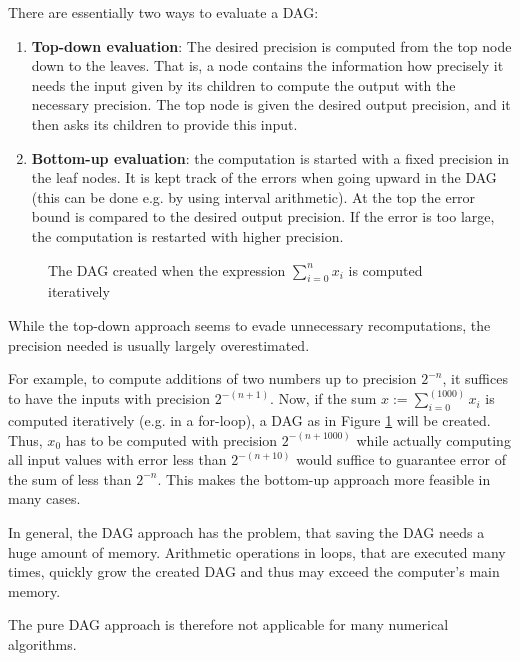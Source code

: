 		There are essentially two ways to evaluate a DAG:
		\begin{enumerate}
			\item \textbf{Top-down evaluation}: The desired precision is computed from the top node down to the leaves.
			That is, a node contains the information how precisely it needs the
      input given by its children to compute the output with the necessary precision.
      The top node is given the desired output precision, and it then asks its
      children to provide this input.
			\item \textbf{Bottom-up evaluation}:  the computation is started with a fixed precision in the leaf nodes. 
			It is kept track of the errors when going upward in the DAG (this can
      be done e.g. by using interval arithmetic). 
			At the top the error bound is compared to the desired output precision. 
      If the error is too large, the computation is restarted with higher
      precision.
		\end{enumerate}
    \begin{figure}[h]
      \centering
\caption{The DAG created when the expression $\sum_{i=0}^n x_i$ is computed
iteratively}\label{fig:sum dag}
\end{figure}
		While the top-down approach seems to evade unnecessary recomputations, the
    precision needed is usually largely overestimated.

    For example, to compute additions of two numbers up to precision $2^{-n}$,
    it suffices to have the inputs with precision $2^{-(n+1)}$.
    Now, if the sum $x := \sum_{i=0}^(1000) x_i$ is computed iteratively (e.g. in a
    for-loop), a DAG as in Figure \ref{fig:sum dag} will be created. 
    Thus, $x_0$ has to be computed with precision $2^{-(n+1000)}$ while actually
    computing all input values with error less than $2^{-(n+10)}$ would 
    suffice to guarantee error of the sum of less than $2^{-n}$.
    This makes the bottom-up approach more feasible in many cases.

    In general, the DAG approach has the problem, that saving the DAG needs a
    huge amount of memory.
    Arithmetic operations in loops, that are executed many times, quickly grow
    the created DAG and thus may exceed the computer's main memory.

    The pure DAG approach is therefore not applicable for many 
    numerical algorithms.
